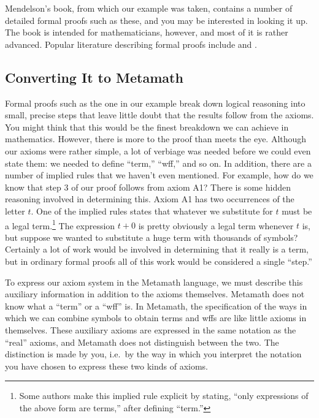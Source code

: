 Mendelson's book, from which our example was taken,
contains a number of detailed formal proofs such as these, and you may be
interested in looking it up.  The book is intended for mathematicians,
however, and most of it is rather advanced.  Popular literature describing
formal proofs include \cite[p.~296]{Rucker} and \cite[pp.~204--230]{Hofstadter}.

\subsection{Converting It to Metamath}\label{convert}

Formal proofs such as the one in our example break down
logical reasoning into small, precise steps that leave little doubt that the
results follow from the axioms.  You might think that this would
be the finest breakdown we can achieve in mathematics.  However, there is more
to the proof than meets the eye. Although our axioms were rather simple, a lot
of verbiage was needed before we could even state them:  we needed to define
``term,'' ``wff,'' and so on.  In addition, there are a number of implied
rules that we haven't even mentioned. For example, how do we know that step 3
of our proof follows from axiom A1? There is some hidden reasoning involved in
determining this.  Axiom A1 has two occurrences of the letter $ t$.  One of
the implied rules states that whatever we substitute for $ t$ must be a legal
term.\footnote{Some authors make this implied rule explicit by
stating, ``only expressions of the above form are terms,'' after defining
``term.''}  The expression $ t+0$ is pretty obviously a legal term whenever $
t$ is, but suppose we wanted to substitute a huge term with thousands of
symbols?  Certainly a lot of work would be involved in determining that it
really is a term, but in ordinary formal proofs all of this work would be
considered a single ``step.''

To express our axiom system in the Metamath language, we must
describe this auxiliary information in addition to the axioms themselves.
Metamath does not know what a ``term'' or a ``wff'' is.  In Metamath, the specification of the ways in which we can combine
symbols to obtain terms and wffs are like little axioms in themselves.  These
auxiliary axioms are expressed in the same notation as the ``real''
axioms, and Metamath does not distinguish between the two.  The
distinction is made by you, i.e.\ by the way in which you interpret the
notation you have chosen to express these two kinds of axioms.

